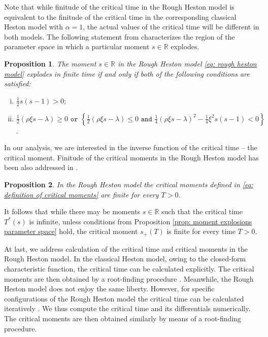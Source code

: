 \documentclass[12pt,twoside]{article}
\theoremstyle{plain}
\theoremstyle{plain}
\newtheorem{proposition}{Proposition}[section]
\theoremstyle{definition}
\theoremstyle{remark}
\numberwithin{equation}{section}
\begin{document}
Note that while finitude of the critical time in the Rough Heston model is equivalent to the finitude of the critical time in the corresponding classical Heston model with $\alpha = 1$, the actual values of the critical time will be different in both models. The following statement from \cite{GGP18} characterizes the region of the parameter space in which a particular moment $s\in \mathbb R$ explodes.

\newpage

\begin{proposition}

The moment $s\in \mathbb R$ in the Rough Heston model \eqref{eq: rough heston model} explodes in finite time if and only if both of the following conditions are satisfied:

\end{proposition}

\begin{enumerate}[(i)]
    \item $\frac 12 s(s-1) > 0$;
    \item $
    \frac 12 (\rho \xi s - \lambda) \geq 0 \texttt{ or } \left\{ \frac 12 (\rho \xi s - \lambda) \leq 0 \texttt { and } \frac 14 (\rho \xi s - \lambda)^2 - \frac 14 \xi^2 s(s-1) <0 \right\}$.
\end{enumerate}

In our analysis, we are interested in the inverse function of the critical time – the critical moment. Finitude of the critical moments in the Rough Heston model has been also addressed in \cite{GGP18}.

\vspace{10pt}

\begin{proposition}
In the Rough Heston model the critical moments defined in \eqref{eq: definition of critical moments} are finite for every $T>0$.
\end{proposition}

It follows that while there may be moments $s\in \mathbb R$ such that the critical time $T^*(s)$ is infinite, unless conditions from Proposition \ref{prop: moment explosions parameter space} hold, the critical moment $s_+(T)$ is finite for every time $T>0$.

At last, we address calculation of the critical time and critical moments in the Rough Heston model. In the classical Heston model, owing to the closed-form characteristic function, the critical time can be calculated explicitly. The critical moments are then obtained by a root-finding procedure \cite{AP06}. Meanwhile, the Rough Heston model does not enjoy the same liberty. However, for specific configurations of the Rough Heston model the critical time can be calculated iteratively \cite{GGP18}. We thus compute the critical time and its differentials numerically. The critical moments are then obtained similarly by means of a root-finding procedure. 
\end{document}
